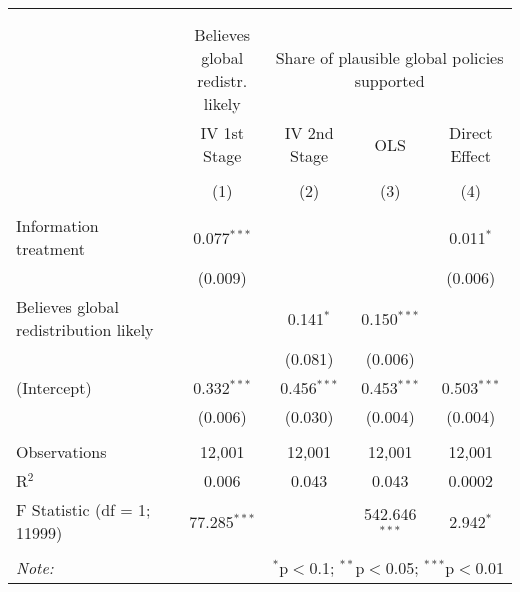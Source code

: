 
\begin{tabular}{@{\extracolsep{5pt}}lcccc} 
\\[-1.8ex]\hline 
\hline \\[-1.8ex] 
\\[-1.8ex] & \makecell{Believes global\\redistr. likely} & \multicolumn{3}{c}{Share of plausible global policies supported} \\ 
 & IV 1st Stage & IV 2nd Stage & OLS & Direct Effect \\ 
\\[-1.8ex] & (1) & (2) & (3) & (4)\\ 
\hline \\[-1.8ex] 
 Information treatment & 0.077$^{***}$ &  &  & 0.011$^{*}$ \\ 
  & (0.009) &  &  & (0.006) \\ 
  Believes global redistribution likely &  & 0.141$^{*}$ & 0.150$^{***}$ &  \\ 
  &  & (0.081) & (0.006) &  \\ 
  (Intercept) & 0.332$^{***}$ & 0.456$^{***}$ & 0.453$^{***}$ & 0.503$^{***}$ \\ 
  & (0.006) & (0.030) & (0.004) & (0.004) \\ 
 \hline \\[-1.8ex] 
Observations & 12,001 & 12,001 & 12,001 & 12,001 \\ 
R$^{2}$ & 0.006 & 0.043 & 0.043 & 0.0002 \\ 
F Statistic (df = 1; 11999) & 77.285$^{***}$ &  & 542.646$^{***}$ & 2.942$^{*}$ \\ 
\hline 
\hline \\[-1.8ex] 
\textit{Note:}  & \multicolumn{4}{r}{$^{*}$p$<$0.1; $^{**}$p$<$0.05; $^{***}$p$<$0.01} \\ 
\end{tabular} 
